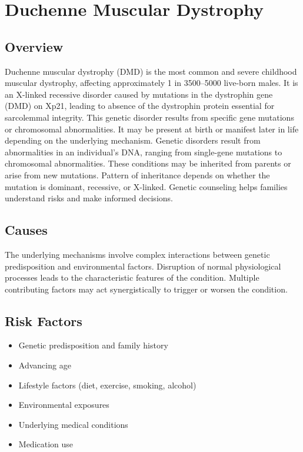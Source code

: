 \chapter{Duchenne Muscular Dystrophy}
\label{sec:Duchenne Muscular Dystrophy}

\section{Overview}
Duchenne muscular dystrophy (DMD) is the most common and severe childhood muscular dystrophy, affecting approximately 1 in 3500--5000 live-born males. It is an X-linked recessive disorder caused by mutations in the dystrophin gene (DMD) on Xp21, leading to absence of the dystrophin protein essential for sarcolemmal integrity. This genetic disorder results from specific gene mutations or chromosomal abnormalities. It may be present at birth or manifest later in life depending on the underlying mechanism. Genetic disorders result from abnormalities in an individual's DNA, ranging from single-gene mutations to chromosomal abnormalities. These conditions may be inherited from parents or arise from new mutations. Pattern of inheritance depends on whether the mutation is dominant, recessive, or X-linked. Genetic counseling helps families understand risks and make informed decisions.
\section{Causes}
The underlying mechanisms involve complex interactions between genetic predisposition and environmental factors. Disruption of normal physiological processes leads to the characteristic features of the condition. Multiple contributing factors may act synergistically to trigger or worsen the condition.
\section{Risk Factors}


\begin{itemize}[noitemsep]
  \item Genetic predisposition and family history
  \item Advancing age
  \item Lifestyle factors (diet, exercise, smoking, alcohol)
  \item Environmental exposures
  \item Underlying medical conditions
  \item Medication use
\end{itemize}
